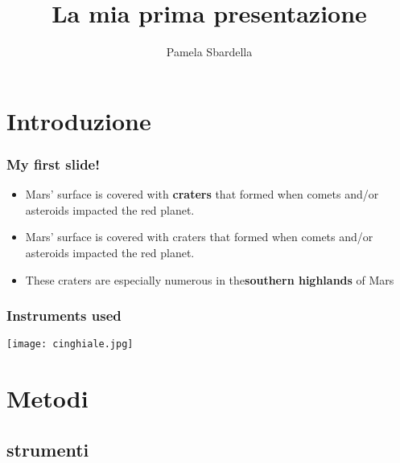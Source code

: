 \documentclass{beamer}
\title{La mia prima presentazione}
\author{Pamela Sbardella}
\begin{document}
\maketitle




\section{Introduzione}

\begin{frame}
\frametitle{My first slide!}
\begin{itemize}  %
\item Mars' surface is covered with \textbf{craters} that formed when comets and/or asteroids impacted the red planet.  %
\item Mars' surface is covered with craters that formed when comets and/or asteroids impacted the red planet.
\item \pause These craters are especially numerous in the\textbf{southern highlands} of Mars   %
\end{itemize} 
\end{frame}


\begin{frame}
\frametitle{Instruments used}
\centering
\texttt{[image: cinghiale.jpg]}  %
\end{frame}


\section{Metodi}

\subsection{strumenti} %
\end{document}
